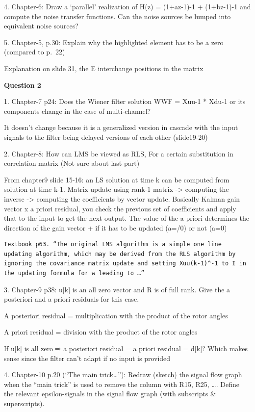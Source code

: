\documentclass[
  a4paper,
  ,captions=tableheading
]{scrartcl}
\begin{document}
4. Chapter-6: Draw a `parallel' realization of H(z) = (1+az-1)-1 +
(1+bz-1)-1 and compute the noise transfer functions. Can the noise
sources be lumped into equivalent noise sources?

5. Chapter-5, p.30: Explain why the highlighted element has to be a zero
(compared to p.~22)

Explanation on slide 31, the E interchange positions in the matrix

\textbf{Question 2}

1. Chapter-7 p24: Does the Wiener filter solution WWF = Xuu-1 * Xdu-1 or
its components change in the case of multi-channel?

It doesn't change because it is a generalized version in cascade with
the input signals to the filter being delayed versions of each other
(slide19-20)

2. Chapter-8: How can LMS be viewed as RLS, For a certain substitution
in correlation matrix (Not sure about last part)

From chapter9 slide 15-16: an LS solution at time k can be computed from
solution at time k-1. Matrix update using rank-1 matrix -\textgreater{}
computing the inverse -\textgreater{} computing the coefficients by
vector update. Basically Kalman gain vector x a priori residual, you
check the previous set of coefficients and apply that to the input to
get the next output. The value of the a priori determines the direction
of the gain vector + if it has to be updated (a=/0) or not (a=0)

\begin{lstlisting}
Textbook p63. “The original LMS algorithm is a simple one line updating algorithm, which may be derived from the RLS algorithm by ignoring the covariance matrix update and setting Xuu(k-1)^-1 to I in the updating formula for w leading to …”
\end{lstlisting}

3. Chapter-9 p38: u{[}k{]} is an all zero vector and R is of full rank.
Give the a posteriori and a priori residuals for this case.

A posteriori residual = multiplication with the product of the rotor
angles

A priori residual = division with the product of the rotor angles

If u{[}k{]} is all zero ⇨ a posteriori residual = a priori residual =
d{[}k{]}? Which makes sense since the filter can't adapt if no input is
provided

4. Chapter-10 p.20 (``The main trick\ldots''): Redraw (sketch) the
signal flow graph when the ``main trick'' is used to remove the column
with R15, R25, \ldots. Define the relevant epsilon-signals in the signal
flow graph (with subscripts \& superscripts).
\end{document}

